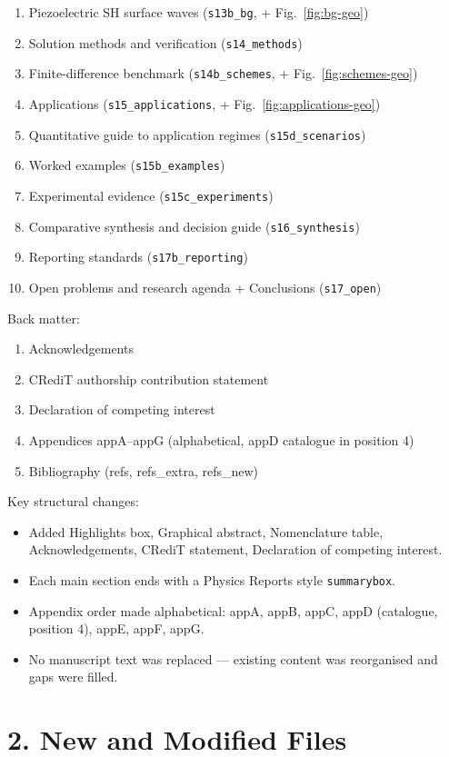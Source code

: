 \documentclass[12pt,a4paper]{article}
\begin{document}
\begin{enumerate}[nosep,leftmargin=1.6em]
\item Piezoelectric SH surface waves ({\tt s13b\_bg}, + Fig.~\ref*{fig:bg-geo})
\item Solution methods and verification ({\tt s14\_methods})
\item Finite-difference benchmark ({\tt s14b\_schemes}, + Fig.~\ref*{fig:schemes-geo})
\item Applications ({\tt s15\_applications}, + Fig.~\ref*{fig:applications-geo})
\item Quantitative guide to application regimes ({\tt s15d\_scenarios})
\item Worked examples ({\tt s15b\_examples})
\item Experimental evidence ({\tt s15c\_experiments})
\item Comparative synthesis and decision guide ({\tt s16\_synthesis})
\item Reporting standards ({\tt s17b\_reporting})
\item Open problems and research agenda + Conclusions ({\tt s17\_open})
\end{enumerate}

Back matter:
\begin{enumerate}[nosep,leftmargin=1.6em]
\item Acknowledgements
\item CRediT authorship contribution statement
\item Declaration of competing interest
\item Appendices appA--appG (alphabetical, appD catalogue in position 4)
\item Bibliography (refs, refs\_extra, refs\_new)
\end{enumerate}

Key structural changes:
\begin{itemize}[nosep]
\item Added Highlights box, Graphical abstract, Nomenclature table, Acknowledgements, CRediT statement, Declaration of competing interest.
\item Each main section ends with a Physics Reports style \texttt{summarybox}.
\item Appendix order made alphabetical: appA, appB, appC, appD (catalogue, position 4), appE, appF, appG.
\item No manuscript text was replaced --- existing content was reorganised and gaps were filled.
\end{itemize}

\section*{2. New and Modified Files}
\end{document}
